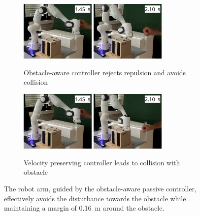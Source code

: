 \ifthesis
\begin{figure}[htbp]
    \centering
   \begin{subfigure}{\columnwidth}
    \includegraphics[width=0.4\textwidth]{figures/franka_sequence/franka_obstacle_aware016}\hfill%
    \includegraphics[width=0.4\textwidth]{figures/franka_sequence/franka_obstacle_aware020}
      \caption{Obstacle-aware controller rejects repulsion and avoids collision}
      \label{fig:franka_sequence_obstacle_aware}
    \end{subfigure}
	\begin{subfigure}{\columnwidth}
    \includegraphics[width=0.4\textwidth]{figures/franka_sequence/franka_velocity_conserving021}\hfill%
    \includegraphics[width=0.4\textwidth]{figures/franka_sequence/franka_velocity_conserving025}\hfill%
      \caption{Velocity preserving controller leads to collision with obstacle}
      \label{fig:franka_sequence_obstacle_aware}
    \end{subfigure}
	\caption{The robot arm, guided by the obstacle-aware passive controller, effectively avoids the disturbance towards the obstacle while maintaining a margin of \qty{0.16}{m} around the obstacle.}
	\label{fig:instances_evaluation_on_robot_arm}
\end{figure}

